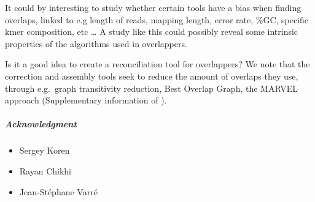 \documentclass[./main.tex]{subfiles}
\begin{document}
It could by interesting to study whether certain tools have a bias when
finding overlaps, linked to e.g length of reads, mapping length, error
rate, \%GC, specific kmer composition, etc \ldots{} A study like this
could possibly reveal some intrinsic properties of the algorithms used
in overlappers.

Is it a good idea to create a reconciliation tool for overlappers? We
note that the correction and assembly tools seek to reduce the amount of
overlaps they use, through e.g.~graph transitivity reduction, Best
Overlap Graph, the MARVEL approach (Supplementary information of \cite{MARVEL}).

\subparagraph{Acknowledgment}\label{preassembly:ovl:acknowledgment}

\begin{itemize}
\item Sergey Koren
\item Rayan Chikhi
\item Jean-Stéphane Varré
\end{itemize}
\end{document}

